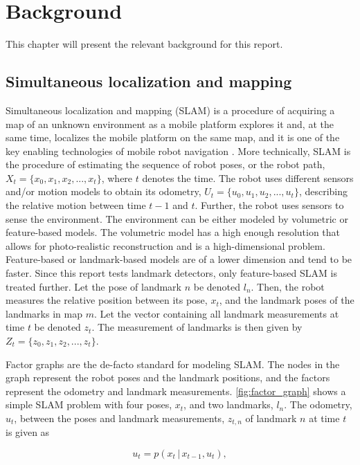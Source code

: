 \chapter{Background}

This chapter will present the relevant background for this report. 

\section{Simultaneous localization and mapping}

Simultaneous localization and mapping (SLAM) is a procedure of acquiring a map of an unknown environment as a mobile platform explores it and, at the same time, localizes the mobile platform on the same map, and it is one of the key enabling technologies of mobile robot navigation \cite{Stachniss2016SimultaneousMapping}. More technically, SLAM is the procedure of estimating the sequence of robot poses, or the robot path, $X_t = \{x_0, x_1, x_2,...,x_t\}$, where $t$ denotes the time. The robot uses different sensors and/or motion models to obtain its odometry, $U_t = \{u_0, u_1, u_2,...,u_t\}$, describing the relative motion between time $t-1$ and $t$. Further, the robot uses sensors to sense the environment. The environment can be either modeled by volumetric or feature-based models. The volumetric model has a high enough resolution that allows for photo-realistic reconstruction and is a high-dimensional problem. Feature-based or landmark-based models are of a lower dimension and tend to be faster. Since this report tests landmark detectors, only feature-based SLAM is treated further. Let the pose of landmark $n$ be denoted $l_n$. Then, the robot measures the relative position between its pose, $x_t$, and the landmark poses of the landmarks in map $m$. Let the vector containing all landmark measurements at time $t$ be denoted $z_t$. The measurement of landmarks is then given by $Z_t = \{z_0, z_1, z_2,...,z_t\}$.

Factor graphs are the de-facto standard for modeling SLAM. The nodes in the graph represent the robot poses and the landmark positions, and the factors represent the odometry and landmark measurements. \cref{fig:factor_graph} shows a simple SLAM problem with four poses, $x_t$, and two landmarks, $l_n$. The odometry, $u_t$, between the poses and landmark measurements, $z_{t,n}$ of landmark $n$ at time $t$ is given as

\begin{equation}
    u_t = p(x_t \,|\, x_{t-1},u_t),
    \label{eq:odom_pdf}
\end{equation}

